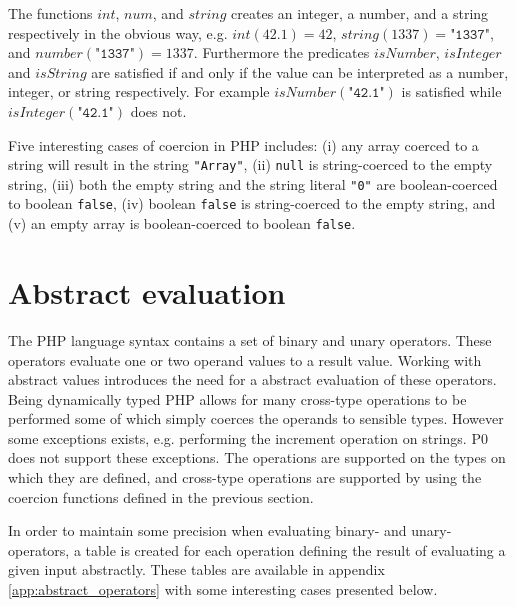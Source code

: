The functions $\mathit{int}$, $\mathit{num}$, and $\mathit{string}$ creates an integer, a number, and a string respectively in the obvious way, e.g. $\mathit{int}(42.1) = 42$, $\mathit{string}(1337) = \texttt{"1337"}$, and $\mathit{number}(\texttt{"1337"}) = 1337$. Furthermore the predicates $\mathit{isNumber}$, $\mathit{isInteger}$ and $\mathit{isString}$ are satisfied if and only if the value can be interpreted as a number, integer, or string respectively. For example $\mathit{isNumber}(\texttt{"42.1"})$ is satisfied while $\mathit{isInteger}(\texttt{"42.1"})$ does not.

Five interesting cases of coercion in PHP includes: (i) any array coerced to a string will result in the string \texttt{"Array"}, (ii) \texttt{null} is string-coerced to the empty string, (iii) both the empty string and the string literal \texttt{"0"} are boolean-coerced to boolean \texttt{false}, (iv) boolean \texttt{false} is string-coerced to the empty string, and (v) an empty array is boolean-coerced to boolean \texttt{false}.


\section{Abstract evaluation}
\label{sec:abseval}
The PHP language syntax contains a set of binary and unary operators. These operators evaluate one or two operand values to a result value. Working with abstract values introduces the need for a abstract evaluation of these operators. Being dynamically typed PHP allows for many cross-type operations to be performed some of which simply coerces the operands to sensible types. However some exceptions exists, e.g. performing the increment operation on strings. P0 does not support these exceptions. The operations are supported on the types on which they are defined, and cross-type operations are supported by using the coercion functions defined in the previous section.

In order to maintain some precision when evaluating binary- and unary-operators, a table is created for each operation defining the result of evaluating a given input abstractly. These tables are available in appendix \ref{app:abstract_operators} with some interesting cases presented below.


